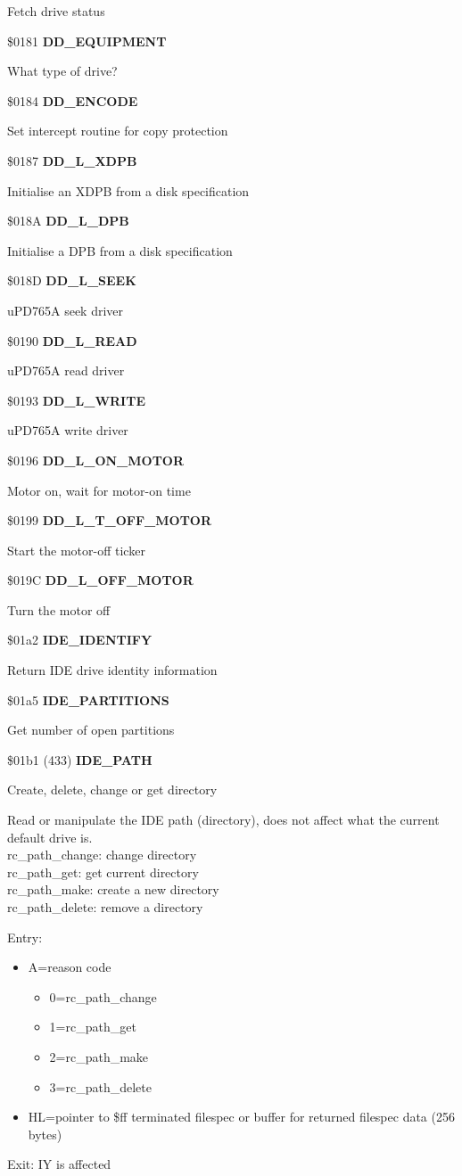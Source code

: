 Fetch drive status

\$0181 \textbf{DD\_EQUIPMENT}

What type of drive?

\$0184 \textbf{DD\_ENCODE}

Set intercept routine for copy protection

\$0187 \textbf{DD\_L\_XDPB}

Initialise an XDPB from a disk specification

\$018A \textbf{DD\_L\_DPB}

Initialise a DPB from a disk specification

\$018D \textbf{DD\_L\_SEEK}

uPD765A seek driver

\$0190 \textbf{DD\_L\_READ}

uPD765A read driver

\$0193 \textbf{DD\_L\_WRITE}

uPD765A write driver

\$0196 \textbf{DD\_L\_ON\_MOTOR}

Motor on, wait for motor-on time

\$0199 \textbf{DD\_L\_T\_OFF\_MOTOR}

Start the motor-off ticker

\$019C \textbf{DD\_L\_OFF\_MOTOR}

Turn the motor off

\$01a2 \textbf{IDE\_IDENTIFY}

Return IDE drive identity information

\$01a5 \textbf{IDE\_PARTITIONS}

Get number of open partitions

\$01b1 (433) \textbf{IDE\_PATH}

Create, delete, change or get directory

Read or manipulate the IDE path (directory), does not affect what the
current default drive is.\\
rc\_path\_change: change directory\\
rc\_path\_get: get current directory\\
rc\_path\_make: create a new directory\\
rc\_path\_delete: remove a directory

Entry:
\begin{itemize}
\item[] A=reason code
  \begin{itemize}
  \item[] 0=rc\_path\_change
  \item[] 1=rc\_path\_get
  \item[] 2=rc\_path\_make
  \item[] 3=rc\_path\_delete
  \end{itemize}
  \item[] HL=pointer to \$ff terminated filespec or buffer for
    returned filespec data (256 bytes)
\end{itemize}
Exit: IY is affected

